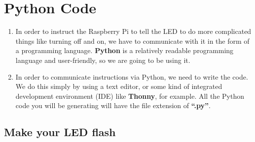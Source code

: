 \documentclass{article}\usepackage[]{graphicx}\usepackage[]{color}
\begin{document}
\section{Python Code}

\begin{enumerate}
\item In order to instruct the Raspberry Pi to tell the LED to do more complicated things like turning off and on, we have to communicate with it in the form of a programming language. \textbf{Python} is a relatively readable programming language and user-friendly, so we are going to be using it.
\item In order to communicate instructions via Python, we need to write the code. We do this simply by using a text editor, or some kind of integrated development environment (IDE) like \textbf{Thonny}, for example. All the Python code you will be generating will have the file extension of \textbf{``.py''}.
\end{enumerate}

\subsection{Make your LED flash}
\end{document}
